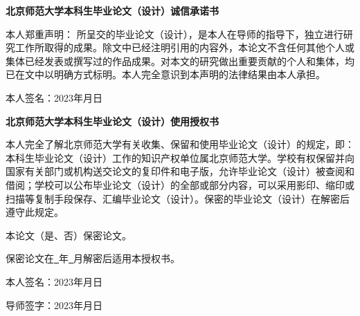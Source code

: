 \begin{center}
\textbf{\songti 北京师范大学本科生毕业论文（设计）诚信承诺书}
\end{center}
\par 本人郑重声明： 所呈交的毕业论文（设计），是本人在导师的指导下，独立进行研究工作所取得的成果。除文中已经注明引用的内容外，本论文不含任何其他个人或集体已经发表或撰写过的作品成果。对本文的研究做出重要贡献的个人和集体，均已在文中以明确方式标明。本人完全意识到本声明的法律结果由本人承担。
\par\vspace{2em} 本人签名：\hfill 2023年\quad 月\quad 日\hspace{2em}
\\\vspace{4em}
\begin{center}
\textbf{\songti 北京师范大学本科生毕业论文（设计）使用授权书}
\end{center}
\par 本人完全了解北京师范大学有关收集、保留和使用毕业论文（设计）的规定，即：本科生毕业论文（设计）工作的知识产权单位属北京师范大学。学校有权保留并向国家有关部门或机构送交论文的复印件和电子版，允许毕业论文（设计）被查阅和借阅；学校可以公布毕业论文（设计）的全部或部分内容，可以采用影印、缩印或扫描等复制手段保存、汇编毕业论文（设计）。保密的毕业论文（设计）在解密后遵守此规定。
\par\vspace{4em} 本论文（是、否）保密论文。
\par 保密论文在\underline{\qquad\ }年\underline{\qquad\ }月解密后适用本授权书。
\par\vspace{4em} 本人签名：\hfill 2023年\quad 月\quad 日\hspace{2em}
\par\vspace{4em} 导师签字：\hfill 2023年\quad 月\quad 日\hspace{2em}
